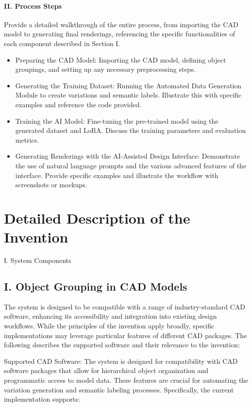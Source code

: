 \documentclass{article}
\begin{document}
\paragraph{II. Process Steps}    

Provide a detailed walkthrough of the entire process, from importing the CAD model to generating final renderings, referencing the specific functionalities of each component described in Section I.

\begin{itemize}
   \item Preparing the CAD Model: Importing the CAD model, defining object groupings, and setting up any necessary preprocessing steps.
   \item Generating the Training Dataset: Running the Automated Data Generation Module to create variations and semantic labels.  Illustrate this with specific examples and reference the code provided.
   \item Training the AI Model:  Fine-tuning the pre-trained model using the generated dataset and LoRA.  Discuss the training parameters and evaluation metrics.
   \item Generating Renderings with the AI-Assisted Design Interface:  Demonstrate the use of natural language prompts and the various advanced features of the interface.  Provide specific examples and illustrate the workflow with screenshots or mockups.
\end{itemize}



\section{Detailed Description of the Invention}

I. System Components

\subsection{I. Object Grouping in CAD Models}

The system is designed to be compatible with a range of industry-standard CAD software, enhancing its accessibility and integration into existing design workflows. While the principles of the invention apply broadly, specific implementations may leverage particular features of different CAD packages. The following describes the supported software and their relevance to the invention:

Supported CAD Software: The system is designed for compatibility with CAD software packages that allow for hierarchical object organization and programmatic access to model data. These features are crucial for automating the variation generation and semantic labeling processes. Specifically, the current implementation supports:
\end{document}
